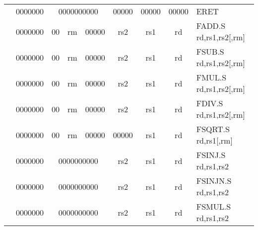 \begin{table}[p]
\begin{small}
\begin{center}
\begin{tabular}{rcccccccccl}
&
\multicolumn{1}{|c|}{0000000} &
\multicolumn{5}{c|}{0000000000} &
\multicolumn{1}{c|}{00000} &
\multicolumn{1}{c|}{00000} &
\multicolumn{1}{c|}{00000} & ERET  \\
\cline{2-10}
  

&
\multicolumn{1}{|c|}{0000000} &
\multicolumn{1}{c|}{00} &
\multicolumn{2}{c|}{rm} &
\multicolumn{2}{c|}{00000} &
\multicolumn{1}{c|}{rs2} &
\multicolumn{1}{c|}{rs1} &
\multicolumn{1}{c|}{rd} & FADD.S rd,rs1,rs2[,rm] \\
\cline{2-10}
  

&
\multicolumn{1}{|c|}{0000000} &
\multicolumn{1}{c|}{00} &
\multicolumn{2}{c|}{rm} &
\multicolumn{2}{c|}{00000} &
\multicolumn{1}{c|}{rs2} &
\multicolumn{1}{c|}{rs1} &
\multicolumn{1}{c|}{rd} & FSUB.S rd,rs1,rs2[,rm] \\
\cline{2-10}
  

&
\multicolumn{1}{|c|}{0000000} &
\multicolumn{1}{c|}{00} &
\multicolumn{2}{c|}{rm} &
\multicolumn{2}{c|}{00000} &
\multicolumn{1}{c|}{rs2} &
\multicolumn{1}{c|}{rs1} &
\multicolumn{1}{c|}{rd} & FMUL.S rd,rs1,rs2[,rm] \\
\cline{2-10}
  

&
\multicolumn{1}{|c|}{0000000} &
\multicolumn{1}{c|}{00} &
\multicolumn{2}{c|}{rm} &
\multicolumn{2}{c|}{00000} &
\multicolumn{1}{c|}{rs2} &
\multicolumn{1}{c|}{rs1} &
\multicolumn{1}{c|}{rd} & FDIV.S rd,rs1,rs2[,rm] \\
\cline{2-10}
  

&
\multicolumn{1}{|c|}{0000000} &
\multicolumn{1}{c|}{00} &
\multicolumn{2}{c|}{rm} &
\multicolumn{2}{c|}{00000} &
\multicolumn{1}{c|}{00000} &
\multicolumn{1}{c|}{rs1} &
\multicolumn{1}{c|}{rd} & FSQRT.S rd,rs1[,rm] \\
\cline{2-10}
  

&
\multicolumn{1}{|c|}{0000000} &
\multicolumn{5}{c|}{0000000000} &
\multicolumn{1}{c|}{rs2} &
\multicolumn{1}{c|}{rs1} &
\multicolumn{1}{c|}{rd} & FSINJ.S rd,rs1,rs2 \\
\cline{2-10}
  

&
\multicolumn{1}{|c|}{0000000} &
\multicolumn{5}{c|}{0000000000} &
\multicolumn{1}{c|}{rs2} &
\multicolumn{1}{c|}{rs1} &
\multicolumn{1}{c|}{rd} & FSINJN.S rd,rs1,rs2 \\
\cline{2-10}
  

&
\multicolumn{1}{|c|}{0000000} &
\multicolumn{5}{c|}{0000000000} &
\multicolumn{1}{c|}{rs2} &
\multicolumn{1}{c|}{rs1} &
\multicolumn{1}{c|}{rd} & FSMUL.S rd,rs1,rs2 \\
\cline{2-10}
  


\end{tabular}
\end{center}
\end{small}
\end{table}
